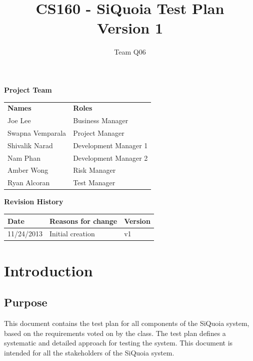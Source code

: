 \documentclass[12pt]{article}
\begin{document}
\title{CS160 - SiQuoia Test Plan \\ {\normalsize Version 1}}

\author{{\Large Team Q06}}

\begin{titlepage}
\maketitle

{\bf Project Team}
\begin{center}
\begin{tabular}{p{4cm} l}
{\bf Names}         & {\bf Roles} \\[.5em]
Joe Lee             & Business Manager \\[1em]
Swapna Vemparala    & Project Manager \\[1em]
Shivalik Narad      & Development Manager 1 \\[1em]
Nam Phan            & Development Manager 2 \\[1em]
Amber Wong          & Risk Manager \\[1em]
Ryan Alcoran        & Test Manager
\end{tabular}
\end{center}

{\bf Revision History}
\begin{center}
\begin{tabular}{|l|l|l|}
\hline
{\bf Date}      & {\bf Reasons for change}  & {\bf Version} \\
\hline
11/24/2013      & Initial creation          & v1 \\
\hline
\end{tabular}
\end{center}

\end{titlepage}

\tableofcontents

\newpage
\section{Introduction}

\subsection{Purpose}
This document contains the test plan for all components of the SiQuoia
system, based on the requirements voted on by the class. The test plan
defines a systematic and detailed approach for testing the
system. This document is intended for all the stakeholders of the
SiQuoia system.
\end{document}
